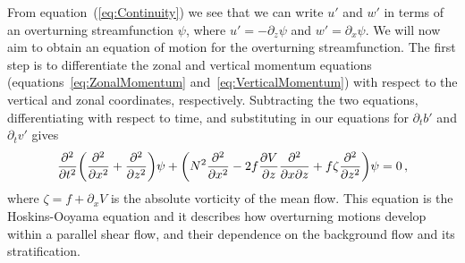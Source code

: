     From equation~(\ref{eq:Continuity}) we see that we can write $u'$ and $w'$ in terms of an overturning streamfunction $\psi$, where $u' = - \partial_z \psi$ and $w' = \partial_x \psi$. We will now aim to obtain an equation of motion for the overturning streamfunction. The first step is to differentiate the zonal and vertical momentum equations (equations~\ref{eq:ZonalMomentum} and~\ref{eq:VerticalMomentum}) with respect to the vertical and zonal coordinates, respectively. Subtracting the two equations, differentiating with respect to time, and substituting in our equations for $\partial_t b'$ and $\partial_t v'$ gives
    \begin{equation}
    \label{eq:OriginalHoskins}
    \pdv[2]{}{t} \bigg(\pdv[2]{}{x} + \pdv[2]{}{z}\bigg) \psi + \bigg( N^2 \pdv[2]{}{x} - 2 f \pdv{V}{z} \pdv[2]{}{x}{z} + f \zeta \pdv[2]{}{z} \bigg) \psi = 0 \, ,
    \end{equation}
    where $\zeta = f + \partial_x V$ is the absolute vorticity of the mean flow. This equation is the Hoskins-Ooyama equation \citep{Hoskins1974, Ooyama1966} and it describes how overturning motions develop within a parallel shear flow, and their dependence on the background flow and its stratification.
    

